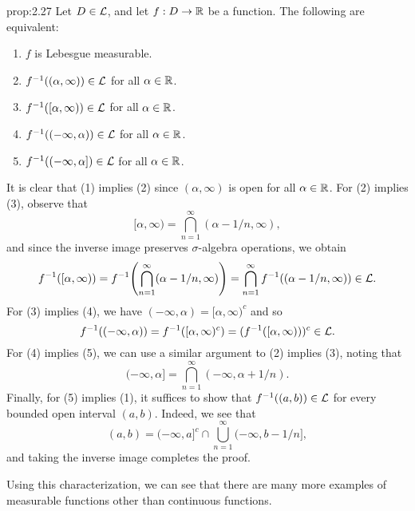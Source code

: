 \begin{prop}{prop:2.27}
    Let $D \in {\cal L}$, and let $f : D \to \mathbb{R}$ be a function. The following are equivalent: 
    \begin{enumerate}[(1)]
        \item $f$ is Lebesgue measurable. 
        \item $f^{-1}((\alpha, \infty)) \in {\cal L}$ for all $\alpha \in \mathbb{R}$. 
        \item $f^{-1}([\alpha, \infty)) \in {\cal L}$ for all $\alpha \in \mathbb{R}$. 
        \item $f^{-1}((-\infty, \alpha)) \in {\cal L}$ for all $\alpha \in \mathbb{R}$. 
        \item $f^{-1}((-\infty, \alpha]) \in {\cal L}$ for all $\alpha \in \mathbb{R}$. 
    \end{enumerate}
\end{prop}
\begin{pf}
    It is clear that (1) implies (2) since $(\alpha, \infty)$ is open
    for all $\alpha \in \mathbb{R}$. For (2) implies (3), observe that 
    \[ [\alpha, \infty) = \bigcap_{n=1}^\infty (\alpha - 1/n, \infty), \] 
    and since the inverse image preserves $\sigma$-algebra operations, 
    we obtain 
    \[ f^{-1}([\alpha, \infty)) = f^{-1}\!\left( \bigcap_{n=1}^\infty 
    (\alpha - 1/n, \infty) \right) = \bigcap_{n=1}^\infty 
    f^{-1}((\alpha - 1/n, \infty)) \in {\cal L}. \] 
    For (3) implies (4), we have $(-\infty, \alpha) = [\alpha, \infty)^c$ 
    and so 
    \[ f^{-1}((-\infty, \alpha)) = f^{-1}([\alpha, \infty)^c) 
    = (f^{-1}([\alpha, \infty)))^c \in {\cal L}. \] 
    For (4) implies (5), we can use a similar argument to (2) implies (3), 
    noting that 
    \[ (-\infty, \alpha] = \bigcap_{n=1}^\infty (-\infty, \alpha + 1/n). \] 
    Finally, for (5) implies (1), it suffices to show that $f^{-1}((a, b)) 
    \in {\cal L}$ for every bounded open interval $(a, b)$. Indeed, we 
    see that 
    \[ (a, b) = (-\infty, a]^c \cap \bigcup_{n=1}^\infty (-\infty, 
    b - 1/n], \] 
    and taking the inverse image completes the proof. 
\end{pf}

Using this characterization, we can see that there are many more examples 
of measurable functions other than continuous functions. 

